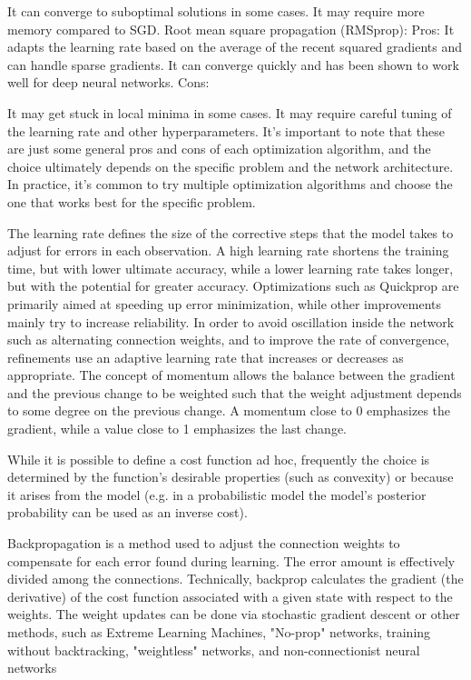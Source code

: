 It can converge to suboptimal solutions in some cases.
It may require more memory compared to \ac{SGD}.
Root mean square propagation (RMSprop):
Pros:
It adapts the learning rate based on the average of the recent squared gradients and can handle sparse gradients.
It can converge quickly and has been shown to work well for deep neural networks.
Cons:

It may get stuck in local minima in some cases.
It may require careful tuning of the learning rate and other hyperparameters.
It's important to note that these are just some general pros and cons of each optimization algorithm, and the choice ultimately depends on the specific problem and the network architecture. In practice, it's common to try multiple optimization algorithms and choose the one that works best for the specific problem.

The learning rate defines the size of the corrective steps that the model takes to adjust for errors in each observation. A high learning rate shortens the training time, but with lower ultimate accuracy, while a lower learning rate takes longer, but with the potential for greater accuracy. Optimizations such as Quickprop are primarily aimed at speeding up error minimization, while other improvements mainly try to increase reliability. In order to avoid oscillation inside the network such as alternating connection weights, and to improve the rate of convergence, refinements use an adaptive learning rate that increases or decreases as appropriate. The concept of momentum allows the balance between the gradient and the previous change to be weighted such that the weight adjustment depends to some degree on the previous change. A momentum close to 0 emphasizes the gradient, while a value close to 1 emphasizes the last change.

While it is possible to define a cost function ad hoc, frequently the choice is determined by the function's desirable properties (such as convexity) or because it arises from the model (e.g. in a probabilistic model the model's posterior probability can be used as an inverse cost).

Backpropagation is a method used to adjust the connection weights to compensate for each error found during learning. The error amount is effectively divided among the connections. Technically, backprop calculates the gradient (the derivative) of the cost function associated with a given state with respect to the weights. The weight updates can be done via stochastic gradient descent or other methods, such as Extreme Learning Machines, "No-prop" networks, training without backtracking, "weightless" networks, and non-connectionist neural networks

